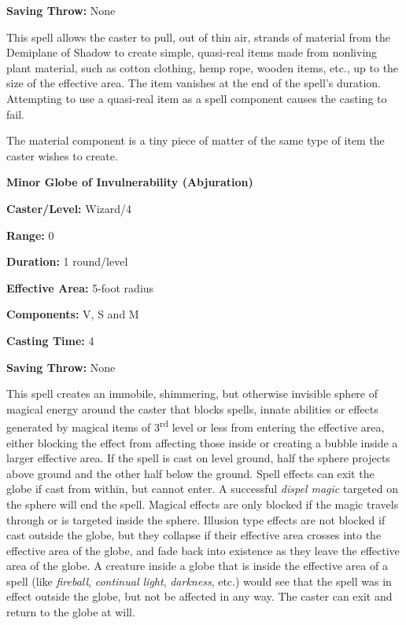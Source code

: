 \begin{multicols}{2}
\begin{minipage}{\columnwidth}
\noindent \textbf{Saving Throw:} None

\end{minipage}

This spell allows the caster to pull, out of thin air, strands of material from the Demiplane of Shadow to create simple, quasi-real items made from nonliving plant material, such as cotton clothing, hemp rope, wooden items, etc., up to the size of the effective area.  The item vanishes at the end of the spell's duration.  Attempting to use a quasi-real item as a spell component causes the casting to fail.  

The material component is a tiny piece of matter of the same type of item the caster wishes to create.

\vspace{1em}

\noindent
\begin{minipage}{\columnwidth}

\noindent \textbf{Minor Globe of Invulnerability (Abjuration)}

\noindent \textbf{Caster/Level:} Wizard/4

\noindent \textbf{Range:} 0

\noindent \textbf{Duration:} 1 round/level

\noindent \textbf{Effective Area:} 5-foot radius

\noindent \textbf{Components:} V, S and M

\noindent \textbf{Casting Time:} 4

\noindent \textbf{Saving Throw:} None

\end{minipage}

This spell creates an immobile, shimmering, but otherwise invisible sphere of magical energy around the caster that blocks spells, innate abilities or effects generated by magical items of 3\textsuperscript{rd} level or less from entering the effective area, either blocking the effect from affecting those inside or creating a bubble inside a larger effective area.  If the spell is cast on level ground, half the sphere projects above ground and the other half below the ground.  Spell effects can exit the globe if cast from within, but cannot enter.  A successful \textit{dispel magic} targeted on the sphere will end the spell.  Magical effects are only blocked if the magic travels through or is targeted inside the sphere.  Illusion type effects are not blocked if cast outside the globe, but they collapse if their effective area crosses into the effective area of the globe, and fade back into existence as they leave the effective area of the globe.  A creature inside a globe that is inside the effective area of a spell (like \textit{fireball}, \textit{continual light}, \textit{darkness}, etc.) would see that the spell was in effect outside the globe, but not be affected in any way.  The caster can exit and return to the globe at will.  


\end{multicols}
